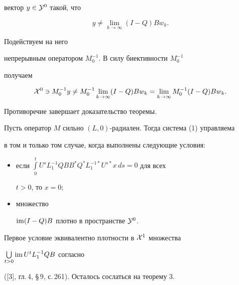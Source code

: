 \begin{pf}
вектор $y\in{\cal Y}^0$ такой, что


$$


y\ne\lim\limits_{k\to\infty}(I-Q)B w_k.


$$


Подействуем на него


непрерывным оператором $M_0^{-1}$. В силу биективности $M_0^{-1}$


получаем


$$


{{\cal X}}^0\ni M_0^{-1}y\ne M_0^{-1}\lim\limits_


{k\to\infty}(I-Q)B w_k=\lim\limits_{k\to\infty}M_0^{-1}(I-Q)B w_k.


$$


Противоречие завершает доказательство теоремы.


\end{pf}





\begin{cor}


Пусть оператор $M$ сильно $(L,0)$-радиален. Тогда система (1) управляема


в том и только том случае, когда выполнены следующие условия:


\begin{itemize}


\item[(i)] если $\int\limits_0^t U^s L_1^{-1}Q B


B^{*}Q^{*}L_1^{-1*}U^{s*}x\,ds=0$ для всех


$t>0$, то $x=0;$


\item[(ii)] множество


$\operatorname{im}(I-Q)B$ плотно в пространстве ${\cal Y}^0$.


\end{itemize}


\end{cor}





\begin{pf}


Первое условие эквивалентно плотности в ${\cal X}^1$ множества


$\bigcup\limits_{t>0}\operatorname{im} U^tL_1^{-1}Q B$ согласно


([3], гл.\,4, \S\,9, с.\,261). Осталось сослаться на теорему 3.


\end{pf}





